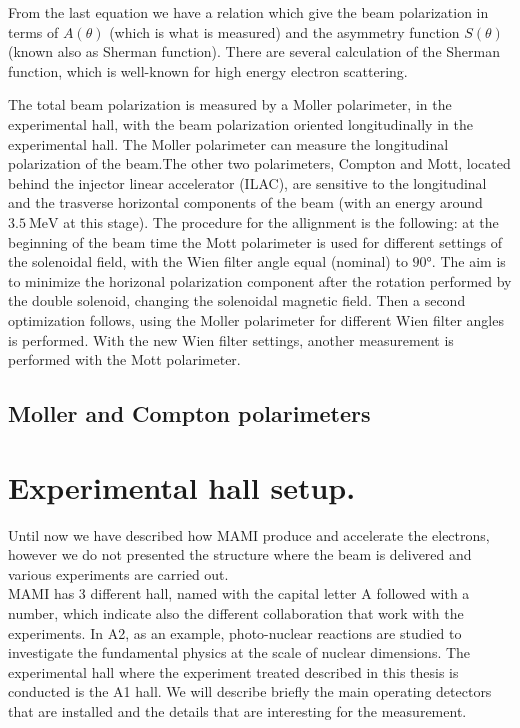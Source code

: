 From the last equation we have a relation which give the beam polarization in terms of $A(\theta)$ (which is what is measured) and the asymmetry function $S(\theta)$ (known also as Sherman function). There are several calculation of the Sherman function, which is well-known for high energy electron scattering.

The total beam polarization is measured by a Moller polarimeter, in the experimental hall, with the beam polarization oriented longitudinally in the experimental hall. The Moller polarimeter can measure the longitudinal polarization of the beam.The other two polarimeters, Compton and Mott, located behind the injector linear accelerator (ILAC), are sensitive to the longitudinal and the trasverse horizontal components of the beam (with an energy around $\SI{3.5}{\mega \electronvolt}$ at this stage). The procedure for the allignment is the following: at the beginning of the beam time the Mott polarimeter is used for different settings of the solenoidal field, with the Wien filter angle equal (nominal) to $\ang{90}$. The aim is to minimize the horizonal polarization component after the rotation performed by the double solenoid, changing the solenoidal magnetic field. Then a second optimization follows, using the Moller polarimeter for different Wien filter angles is performed. With the new Wien filter settings, another measurement is performed with the Mott polarimeter.

\subsection{Moller and Compton polarimeters}


\section{Experimental hall setup.}


Until now we have described how MAMI produce and accelerate the electrons, however we do not presented the structure where the beam is delivered and various experiments are carried out. \\
MAMI has 3 different hall, named with the capital letter A followed with a number, which indicate also the different collaboration that work with the experiments. In A2, as an example, photo-nuclear reactions are studied to investigate the fundamental physics at the scale of nuclear dimensions. The experimental hall where the experiment treated described in this thesis is conducted is the A1 hall. We will describe briefly the main operating detectors that are installed and the details that are interesting for the \transv measurement. \bigskip

